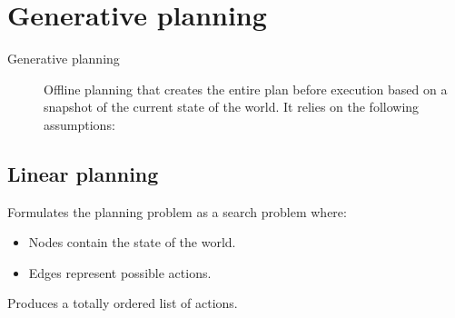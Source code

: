 \chapter{Generative planning}

\begin{description}
    \item[Generative planning] 
        Offline planning that creates the entire plan before execution based on
        a snapshot of the current state of the world.
        It relies on the following assumptions:
\end{description}



\section{Linear planning}
Formulates the planning problem as a search problem where:
\begin{itemize}
    \item Nodes contain the state of the world.
    \item Edges represent possible actions.
\end{itemize}
Produces a totally ordered list of actions.

